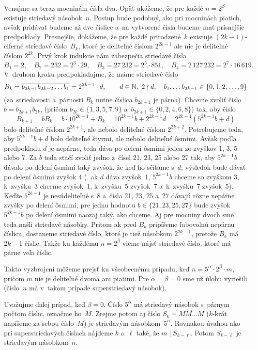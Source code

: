 {Venujme sa teraz mocninám čísla dva. Opäť ukážeme, že pre každé $n=2^\beta$ existuje striedavý násobok~$n$. Postup bude podobný, ako pri mocninách piatich, avšak pridávať budeme až dve číslice a~na vytvorené čísla budeme mať prísnejšie predpoklady. Presnejšie, dokážeme, že pre každé prirodzené~$k$ existuje $(2k-1)$-ciferné striedavé číslo~$B_k$, ktoré je deliteľné číslom $2^{2k-1}$ ale nie je deliteľné číslom $2^{2k}$. Prvý krok indukcie nám zabezpečia striedavé čísla
$$
B_1=2,\quad B_2=232=2^3\cdot29,\quad B_3=27\,232=2^5\cdot851,\quad B_4=2\,127\,232=2^7\cdot16\,619.
$$
V~druhom kroku predpokladajme, že máme striedavé číslo
$$
B_k=\overline{b_{2k-1}b_{2k-2}\dots b_1}=2^{2k-1}\cdot d,\qquad d\in\Bbb N,\ 2\nmid d,
\quad b_1,\dots b_{2k-1}\in\{0,1,2,\dots,9\}
$$
(zo~striedavosti a~párnosti $B_k$ nutne číslica $b_{2k-1}$ je párna). Chceme zvoliť číslo $b=\overline{b_{2k+1}b_{2k}}$, (pričom $b_{2k}\in\{1,3,5,7,9\}$ a~$b_{2k+1}\in\{0,2,4,6,8\}$) tak, aby číslo
$$
B_{k+1}=\overline{bB_k}=b\cdot10^{2k-1}+B_k=10^{2k-1}b+2^{2k-1}d=2^{2k-1}(5^{2k-1}b+d)
$$
bolo deliteľné číslom $2^{2k+1}$, ale nebolo deliteľné číslom $2^{2k+2}$. Potrebujeme teda, aby $5^{2k-1}b+d$ bolo deliteľné štyrmi, ale nebolo deliteľné ôsmimi. Avšak podľa predpokladu $d$ je nepárne, teda dáva po delení ôsmimi jeden zo zvyškov 1, 3, 5 alebo 7. Za $b$ teda stačí zvoliť jedno z~čísel 21, 23, 25 alebo 27 tak, aby $5^{2k-1}b$ dávalo po delení ôsmimi taký zvyšok, že keď ho sčítame s~$d$, výsledok bude dávať po delení ôsmimi zvyšok 4 (\tj. ak $d$ dáva zvyšok~1, $5^{2k-1}b$ chceme so zvyškom 3, k~zvyšku~3 chceme zvyšok~1, k~zvyšku~5 zvyšok~7 a~k~zvyšku~7 zvyšok~5). Keďže $5^{2k-1}$ je nesúdeliteľné s~8 a~čísla 21, 23, 25 a~27 dávajú rôzne nepárne zvyšky po delení ôsmimi, pre jednu hodnotu $b\in\{21,23,25,27\}$ bude zvyšok $5^{2k-1}b$ po delení ôsmimi naozaj taký, ako chceme. Aj pre mocniny dvoch sme teda našli striedavé násobky. Pritom ak pred $B_k$ pripíšeme ľubovoľnú nepárnu číslicu, dostaneme striedavé číslo, ktoré je tiež násobkom $2^{2k-1}$, pretože $B_k$ má $2k-1$ číslic. Takže ku každému $n=2^\beta$ vieme nájsť striedavé číslo, ktoré má párne veľa číslic.

Takto vyzbrojení môžeme prejsť ku všeobecnému prípadu, keď $n=5^\alpha\cdot2^\beta\cdot m$, pričom $m$ nie je deliteľné dvoma ani piatimi. Pre $\alpha=\beta=0$ sme už úlohu vyriešili (číslo~$n$ má v~takom prípade superstriedavý násobok). 

Uvažujme ďalej prípad, keď $\beta=0$. Číslo $5^\alpha$ má striedavý násobok s~párnym počtom číslic, označme ho~$M$. Zrejme potom aj číslo $S_k=\overline{MM\dots M}$ ($k$-krát napíšeme za sebou číslo~$M$) je striedavým násobkom~$5^\alpha$. Rovnakou úvahou ako pri superstriedavých číslach nájdeme $k$ a~$\ell$ také, že $m\mid S_{k-\ell}$.
Potom $S_{k-\ell}$ je striedavým násobkom~$n$.

}

